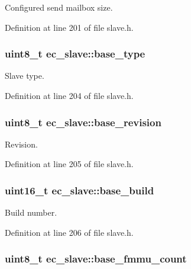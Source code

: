 Configured send mailbox size. 



Definition at line 201 of file slave.\-h.

\subsubsection[{base\-\_\-type}]{\setlength{\rightskip}{0pt plus 5cm}uint8\-\_\-t ec\-\_\-slave\-::base\-\_\-type}\label{structec__slave_a942db00c8dc12ba78cd124b353945301}


Slave type. 



Definition at line 204 of file slave.\-h.

\subsubsection[{base\-\_\-revision}]{\setlength{\rightskip}{0pt plus 5cm}uint8\-\_\-t ec\-\_\-slave\-::base\-\_\-revision}\label{structec__slave_a5346100cbd1fa0187ae3074d4a75d3cc}


Revision. 



Definition at line 205 of file slave.\-h.

\subsubsection[{base\-\_\-build}]{\setlength{\rightskip}{0pt plus 5cm}uint16\-\_\-t ec\-\_\-slave\-::base\-\_\-build}\label{structec__slave_afd680b0cb700169c2a97aa38c0fd0552}


Build number. 



Definition at line 206 of file slave.\-h.

\subsubsection[{base\-\_\-fmmu\-\_\-count}]{\setlength{\rightskip}{0pt plus 5cm}uint8\-\_\-t ec\-\_\-slave\-::base\-\_\-fmmu\-\_\-count}\label{structec__slave_a45adb760f44d08fcab9c81d6022e0bad}


